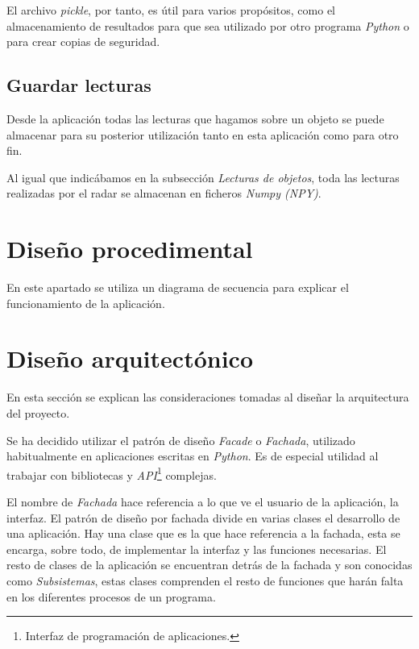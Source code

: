 El archivo \textit{pickle}, por tanto, es útil para varios propósitos, como el almacenamiento de resultados para que sea utilizado por otro programa \textit{Python} o para crear copias de seguridad.

\subsection{Guardar lecturas}

Desde la aplicación todas las lecturas que hagamos sobre un objeto se puede almacenar para su posterior utilización tanto en esta aplicación como para otro fin.

Al igual que indicábamos en la subsección \textit{Lecturas de objetos}, toda las lecturas realizadas por el radar se almacenan en ficheros \textit{Numpy (NPY)}.

\section{Diseño procedimental}

En este apartado se utiliza un diagrama de secuencia para explicar el funcionamiento de la aplicación.


\section{Diseño arquitectónico}

En esta sección se explican las consideraciones tomadas al diseñar la arquitectura del proyecto.

Se ha decidido utilizar el patrón de diseño \textit{Facade}\cite{Facade} o \textit{Fachada}, utilizado habitualmente en aplicaciones escritas en \textit{Python}. Es de especial utilidad al trabajar con bibliotecas y \textit{API}\footnote{Interfaz de programación de aplicaciones.} complejas.

El nombre de \textit{Fachada} hace referencia a lo que ve el usuario de la aplicación, la interfaz. El patrón de diseño por fachada divide en varias clases el desarrollo de una aplicación. Hay una clase que es la que hace referencia a la fachada, esta se encarga, sobre todo, de implementar la interfaz y las funciones necesarias. El resto de clases de la aplicación se encuentran detrás de la fachada y son conocidas como \textit{Subsistemas}, estas clases comprenden el resto de funciones que harán falta en los diferentes procesos de un programa.

